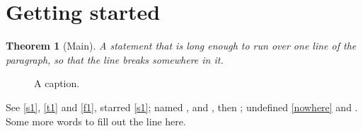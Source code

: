 \documentclass{article}
\newtheorem{theorem}{Theorem}
\begin{document}
\section{Getting started}\label{s1}
\begin{theorem}[Main]\label{t1}
A statement that is long enough to run over one line of the paragraph, so that the line breaks somewhere in it.
\end{theorem}
\begin{figure}[h]\centering\caption{A caption.}\label{f1}\end{figure}
See \autoref{s1}, \autoref{t1} and \autoref{f1}, starred \autoref*{s1}; named ,  and
, then ; undefined \autoref{nowhere} and . Some more words to fill out the line here.
\end{document}
